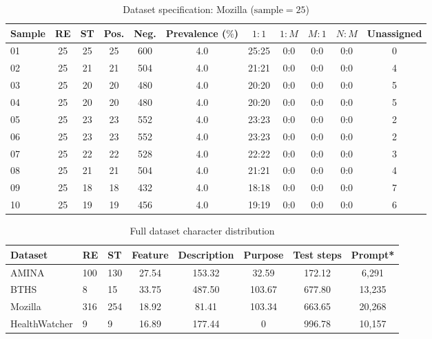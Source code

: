 \documentclass[conference]{IEEEtran}
\begin{document}
\begin{table}[h]
  \centering
  \caption{Dataset specification: Mozilla ($\text{sample}=25$)}
  \begin{tabular}{lcccccccccc}
  \toprule
  Sample & RE & ST & Pos. & Neg. & Prevalence ($\%$) & $1{:}1$ & $1{:}M$ & $M{:}1$ & $N{:}M$ & Unassigned \\
  \midrule
  	01 & 25 & 25 & 25 & 600 & 4.0 & 25:25 & 0:0 & 0:0 & 0:0 & 0\\
	02 & 25 & 21 & 21 & 504 & 4.0 & 21:21 & 0:0 & 0:0 & 0:0 & 4\\
	03 & 25 & 20 & 20 & 480 & 4.0 & 20:20 & 0:0 & 0:0 & 0:0 & 5\\
	04 & 25 & 20 & 20 & 480 & 4.0 & 20:20 & 0:0 & 0:0 & 0:0 & 5\\
	05 & 25 & 23 & 23 & 552 & 4.0 & 23:23 & 0:0 & 0:0 & 0:0 & 2\\
	06 & 25 & 23 & 23 & 552 & 4.0 & 23:23 & 0:0 & 0:0 & 0:0 & 2\\
	07 & 25 & 22 & 22 & 528 & 4.0 & 22:22 & 0:0 & 0:0 & 0:0 & 3\\
	08 & 25 & 21 & 21 & 504 & 4.0 & 21:21 & 0:0 & 0:0 & 0:0 & 4\\
	09 & 25 & 18 & 18 & 432 & 4.0 & 18:18 & 0:0 & 0:0 & 0:0 & 7\\
	10 & 25 & 19 & 19 & 456 & 4.0 & 19:19 & 0:0 & 0:0 & 0:0 & 6\\
  \bottomrule
  \end{tabular}
  \label{tab:mozilla}
\end{table}

\begin{table}[h]
    \centering
    \caption{Full dataset character distribution}
    \begin{tabular}{lllccccc}
    \toprule
    Dataset & RE & ST & Feature & Description & Purpose & Test steps & Prompt* \\
    \midrule
    AMINA         & 100 & 130 & 27.54 & 153.32 & 32.59  & 172.12 & 6,291  \\
    BTHS          & 8 & 15    & 33.75 & 487.50 & 103.67 & 677.80 & 13,235 \\
    Mozilla       & 316 & 254 & 18.92 & 81.41  & 103.34 & 663.65 & 20,268 \\
    HealthWatcher & 9 & 9     & 16.89 & 177.44 & 0      & 996.78 & 10,157  \\
    \bottomrule
    \end{tabular}
    \label{tab:char_distribution}
\end{table}
\end{document}
